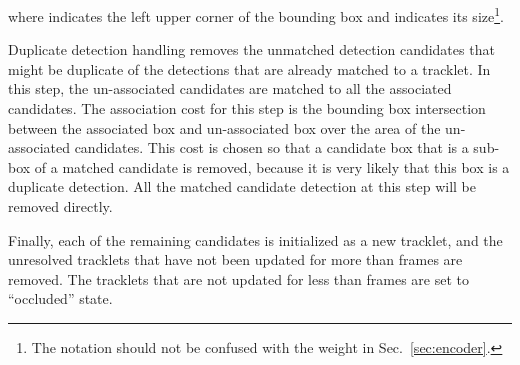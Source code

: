 \documentclass[10pt,twocolumn,letterpaper]{article}
\newcommand{\tb}{}
\begin{document}
where  indicates the left upper corner of the bounding box and  indicates its size\footnote{The notation  should not be confused with the weight  in Sec.~\ref{sec:encoder}.}. 

Duplicate detection handling removes the unmatched detection candidates that might be duplicate of the detections that are already matched to a tracklet.
In this step, the un-associated candidates are matched to all the associated candidates.
The association cost for this step is the bounding box intersection between the associated box and un-associated box over the area of the un-associated candidates. 
This cost is chosen so that a candidate box that is a sub-box of a matched candidate is removed, because it is very likely that this box is a duplicate detection.
All the matched candidate detection at this step will be removed directly. 

Finally, each of the remaining candidates is initialized as a new tracklet, and the unresolved tracklets that have not been updated for more than  frames \tb{are} removed. 
The tracklets that are not updated for less than  frames are set to ``occluded'' state.
\end{document}
